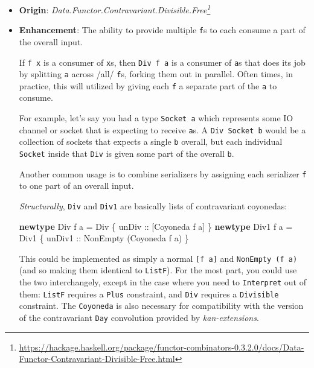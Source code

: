\documentclass[]{article}
\newenvironment{Shaded}{}{}
\newcommand{\DataTypeTok}[1]{\textcolor[rgb]{0.56,0.13,0.00}{#1}}
\newcommand{\KeywordTok}[1]{\textcolor[rgb]{0.00,0.44,0.13}{\textbf{#1}}}
\newcommand{\NormalTok}[1]{#1}
\newcommand{\OtherTok}[1]{\textcolor[rgb]{0.00,0.44,0.13}{#1}}
\renewcommand{\href}[2]{#2\footnote{\url{#1}}}
\begin{document}
\begin{itemize}
\item
  \textbf{Origin}:
  \emph{\href{https://hackage.haskell.org/package/functor-combinators-0.3.2.0/docs/Data-Functor-Contravariant-Divisible-Free.html}{Data.Functor.Contravariant.Divisible.Free}}
\item
  \textbf{Enhancement}: The ability to provide multiple \texttt{f}s to each
  consume a part of the overall input.

  If \texttt{f\ x} is a consumer of \texttt{x}s, then \texttt{Div\ f\ a} is a
  consumer of \texttt{a}s that does its job by splitting \texttt{a} across /all/
  \texttt{f}s, forking them out in parallel. Often times, in practice, this will
  utilized by giving each \texttt{f} a separate part of the \texttt{a} to
  consume.

  For example, let's say you had a type \texttt{Socket\ a} which represents some
  IO channel or socket that is expecting to receive \texttt{a}s. A
  \texttt{Div\ Socket\ b} would be a collection of sockets that expects a single
  \texttt{b} overall, but each individual \texttt{Socket} inside that
  \texttt{Div} is given some part of the overall \texttt{b}.

  Another common usage is to combine serializers by assigning each serializer
  \texttt{f} to one part of an overall input.

  \emph{Structurally}, \texttt{Div} and \texttt{Div1} are basically lists of
  contravariant coyonedas:

\begin{Shaded}
\begin{Highlighting}[]
\KeywordTok{newtype} \DataTypeTok{Div}\NormalTok{  f a }\OtherTok{=} \DataTypeTok{Div}\NormalTok{  \{}\OtherTok{ unDiv  ::}\NormalTok{ [}\DataTypeTok{Coyoneda}\NormalTok{ f a]          \}}
\KeywordTok{newtype} \DataTypeTok{Div1}\NormalTok{ f a }\OtherTok{=} \DataTypeTok{Div1}\NormalTok{ \{}\OtherTok{ unDiv1 ::} \DataTypeTok{NonEmpty}\NormalTok{ (}\DataTypeTok{Coyoneda}\NormalTok{ f a) \}}
\end{Highlighting}
\end{Shaded}

  This could be implemented as simply a normal \texttt{{[}f\ a{]}} and
  \texttt{NonEmpty\ (f\ a)} (and so making them identical to \texttt{ListF}).
  For the most part, you could use the two interchangely, except in the case
  where you need to \texttt{Interpret} out of them: \texttt{ListF} requires a
  \texttt{Plus} constraint, and \texttt{Div} requires a \texttt{Divisible}
  constraint. The \texttt{Coyoneda} is also necessary for compatibility with the
  version of the contravariant \texttt{Day} convolution provided by
  \emph{kan-extensions}.


\end{itemize}
\end{document}
